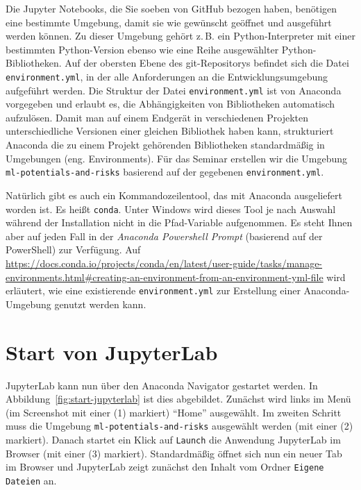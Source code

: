 \documentclass{tufte-handout}
\begin{document}
Die Jupyter Notebooks, die Sie soeben von GitHub bezogen haben, benötigen eine bestimmte Umgebung, damit sie wie gewünscht geöffnet und ausgeführt werden können.
Zu dieser Umgebung gehört z.\,B. ein Python-Interpreter mit einer bestimmten Python-Version ebenso wie eine Reihe ausgewählter Python-Bibliotheken.
Auf der obersten Ebene des git-Repositorys befindet sich die Datei \texttt{environment.yml}, in der alle Anforderungen an die Entwicklungsumgebung aufgeführt werden.
Die Struktur der Datei \texttt{environment.yml} ist von Anaconda vorgegeben und erlaubt es, die Abhängigkeiten von Bibliotheken automatisch aufzulösen.
Damit man auf einem Endgerät in verschiedenen Projekten unterschiedliche Versionen einer gleichen Bibliothek haben kann,
strukturiert Anaconda die zu einem Projekt gehörenden Bibliotheken standardmäßig in Umgebungen (eng. Environments).
Für das Seminar erstellen wir die Umgebung
\texttt{ml-potentials-and-risks}
basierend auf der gegebenen \texttt{environment.yml}.

Natürlich gibt es auch ein Kommandozeilentool, das mit Anaconda ausgeliefert worden ist.
Es heißt \texttt{conda}.
Unter Windows wird dieses Tool je nach Auswahl während der Installation nicht in die Pfad-Variable aufgenommen.
Es steht Ihnen aber auf jeden Fall in der
\emph{Anaconda Powershell Prompt} (basierend auf der PowerShell)
zur Verfügung.
Auf
\url{https://docs.conda.io/projects/conda/en/latest/user-guide/tasks/manage-environments.html#creating-an-environment-from-an-environment-yml-file}
wird erläutert, wie eine existierende \texttt{environment.yml} zur Erstellung einer Anaconda-Umgebung genutzt werden kann.

\section{Start von JupyterLab}

JupyterLab kann nun über den Anaconda Navigator gestartet werden.
In Abbildung~\ref{fig:start-jupyterlab} ist dies abgebildet.
Zunächst wird links im Menü
(im Screenshot mit einer (1) markiert)
\enquote{Home} ausgewählt.
Im zweiten Schritt muss die Umgebung
\texttt{ml-potentials-and-risks}
ausgewählt werden
(mit einer (2) markiert).
Danach startet ein Klick auf \texttt{Launch} die Anwendung JupyterLab im Browser
(mit einer (3) markiert).
Standardmäßig öffnet sich nun ein neuer Tab im Browser und JupyterLab zeigt zunächst den Inhalt vom Ordner \texttt{Eigene Dateien} an.
\end{document}

